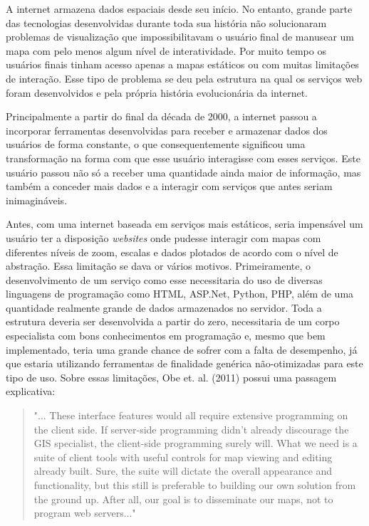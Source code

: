 		A internet armazena dados espaciais desde seu início. No entanto, grande parte das tecnologias desenvolvidas durante toda sua história não solucionaram problemas de visualização que impossibilitavam o usuário final de manusear um mapa com pelo menos algum nível de interatividade. Por muito tempo os usuários finais tinham acesso apenas a mapas estáticos ou com muitas limitações de interação. Esse tipo de problema se deu pela estrutura na qual os serviços web foram desenvolvidos e pela própria história evolucionária da internet. 
		
		Principalmente a partir do final da década de 2000, a internet passou a incorporar ferramentas desenvolvidas para receber e armazenar dados dos usuários de forma constante, o que consequentemente significou uma transformação na forma com que esse usuário interagisse com esses serviços. Este usuário passou não só a receber uma quantidade ainda maior de informação, mas também a conceder mais dados e a interagir com serviços que antes seriam inimagináveis.
		
		Antes, com uma internet baseada em serviços mais estáticos, seria impensável um usuário ter a disposição \textit{websites} onde pudesse interagir com mapas com diferentes níveis de zoom, escalas e dados plotados de acordo com o nível de abstração. Essa limitação se dava or vários motivos. Primeiramente, o desenvolvimento de um serviço como esse necessitaria do uso de diversas linguagens de programação como HTML, ASP.Net, Python, PHP, além de uma quantidade realmente grande de dados armazenados no servidor. Toda a estrutura deveria ser desenvolvida a partir do zero, necessitaria de um corpo especialista com bons conhecimentos em programação e, mesmo que bem implementado, teria uma grande chance de sofrer com a falta de desempenho, já que estaria utilizando ferramentas de finalidade genérica não-otimizadas para este tipo de uso. Sobre essas limitações, Obe et. al. (2011)\cite{OBE_etal11} possui uma passagem explicativa:
		
		\begin{quote}
			"... These interface features would all require extensive programming on the client side. If server-side programming didn’t already discourage the GIS specialist, the client-side programming surely will. What we need is a suite of client tools with useful controls for map viewing and editing already built. Sure, the suite will dictate the overall appearance and functionality, but this still is preferable to building our own solution from the ground up. After all, our goal is to disseminate our maps, not to program web servers..."
		\end{quote}
	
